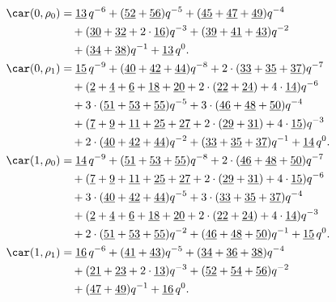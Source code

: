 \begin{align*}
	\car(0,\rho_{0})
	&=\underline{13}\,q^{-6}+(\underline{52}+\underline{56})q^{-5}+(\underline{45}+\underline{47}+\underline{49})q^{-4}\\
	&\quad+(\underline{30}+\underline{32}+2\cdot\underline{16})q^{-3}+(\underline{39}+\underline{41}+\underline{43})q^{-2}\\
	&\quad+(\underline{34}+\underline{38})q^{-1}+\underline{13}\,q^0.\\
	\car(0,\rho_{1})
	&=\underline{15}\,q^{-9}+(\underline{40}+\underline{42}+\underline{44})q^{-8}+2\cdot(\underline{33}+\underline{35}+\underline{37})q^{-7}\\
	&\quad+(\underline{2}+\underline{4}+\underline{6}+\underline{18}+\underline{20}+2\cdot(\underline{22}+\underline{24})+4\cdot\underline{14})q^{-6}\\
	&\quad+3\cdot(\underline{51}+\underline{53}+\underline{55})q^{-5}+3\cdot(\underline{46}+\underline{48}+\underline{50})q^{-4}\\
	&\quad+(\underline{7}+\underline{9}+\underline{11}+\underline{25}+\underline{27}+2\cdot(\underline{29}+\underline{31})+4\cdot\underline{15})q^{-3}\\
	&\quad+2\cdot(\underline{40}+\underline{42}+\underline{44})q^{-2}+(\underline{33}+\underline{35}+\underline{37})q^{-1}+\underline{14}\,q^0.\\
	\car(1,\rho_{0})
	&=\underline{14}\,q^{-9}+(\underline{51}+\underline{53}+\underline{55})q^{-8}+2\cdot(\underline{46}+\underline{48}+\underline{50})q^{-7}\\
	&\quad+(\underline{7}+\underline{9}+\underline{11}+\underline{25}+\underline{27}+2\cdot(\underline{29}+\underline{31})+4\cdot\underline{15})q^{-6}\\
	&\quad+3\cdot(\underline{40}+\underline{42}+\underline{44})q^{-5}+3\cdot(\underline{33}+\underline{35}+\underline{37})q^{-4}\\
	&\quad+(\underline{2}+\underline{4}+\underline{6}+\underline{18}+\underline{20}+2\cdot(\underline{22}+\underline{24})+4\cdot\underline{14})q^{-3}\\
	&\quad+2\cdot(\underline{51}+\underline{53}+\underline{55})q^{-2}+(\underline{46}+\underline{48}+\underline{50})q^{-1}+\underline{15}\,q^0.\\
	\car(1,\rho_{1})
	&=\underline{16}\,q^{-6}+(\underline{41}+\underline{43})q^{-5}+(\underline{34}+\underline{36}+\underline{38})q^{-4}\\
	&\quad+(\underline{21}+\underline{23}+2\cdot\underline{13})q^{-3}+(\underline{52}+\underline{54}+\underline{56})q^{-2}\\
	&\quad+(\underline{47}+\underline{49})q^{-1}+\underline{16}\,q^0.
\end{align*}

